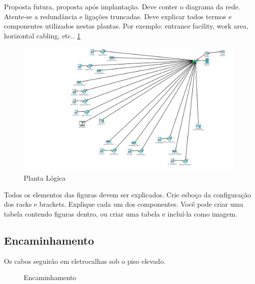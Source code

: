 \documentclass[	DIV=calc,%
paper=a4,%
fontsize=12pt,%
onecolumn]{scrartcl}	 					%
\begin{document}
	Proposta futura, proposta após implantação.
	Deve conter o diagrama da rede. Atente-se a redundância  e ligações truncadas.
	Deve explicar todos termos e componentes utilizados nestas plantas. Por exemplo: entrance facility, work area, horizontal cabling, etc.. \ref{fig2}
	\begin{figure}
		\centering
		\includegraphics[width=\textwidth]{fig2}
		\caption{Planta Lógica}
		\label{fig2}
	\end{figure}	
	Todos os elementos das figuras devem ser explicados. 
	Crie esboço da configuração dos racks e brackets. Explique cada um dos componentes. Você pode criar uma tabela contendo figuras dentro, ou criar uma tabela e incluí-la como imagem. 
	
	\subsection{Encaminhamento}
	Os cabos seguirão em eletrocalhas sob o piso elevado.
	\clearpage
	\recalctypearea
	
	\begin{figure}
		\noindent{}
		\caption{Encaminhamento}
		\label{fig3}
	\end{figure}
	
\end{document}
